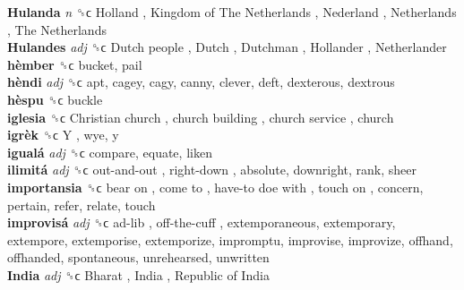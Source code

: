\textbf{Hulanda} \emph{n}  ␝ϲ   Holland ,  Kingdom of The Netherlands ,  Nederland ,  Netherlands ,  The Netherlands   \\
\textbf{Hulandes} \emph{adj}  ␝ϲ   Dutch people ,  Dutch ,  Dutchman ,  Hollander ,  Netherlander   \\
\textbf{hèmber} ␝ϲ  bucket, pail  \\
\textbf{hèndi} \emph{adj}  ␝ϲ  apt, cagey, cagy, canny, clever, deft, dexterous, dextrous  \\
\textbf{hèspu} ␝ϲ  buckle  \\
\textbf{iglesia} ␝ϲ   Christian church ,  church building ,  church service , church  \\
\textbf{igrèk} ␝ϲ   Y , wye, y  \\
\textbf{igualá} \emph{adj}  ␝ϲ  compare, equate, liken  \\
\textbf{ilimitá} \emph{adj}  ␝ϲ   out-and-out ,  right-down , absolute, downright, rank, sheer  \\
\textbf{importansia} ␝ϲ   bear on ,  come to ,  have-to doe with ,  touch on , concern, pertain, refer, relate, touch  \\
\textbf{improvisá} \emph{adj}  ␝ϲ   ad-lib ,  off-the-cuff , extemporaneous, extemporary, extempore, extemporise, extemporize, impromptu, improvise, improvize, offhand, offhanded, spontaneous, unrehearsed, unwritten  \\
\textbf{India} \emph{adj}  ␝ϲ   Bharat ,  India ,  Republic of India   \\
